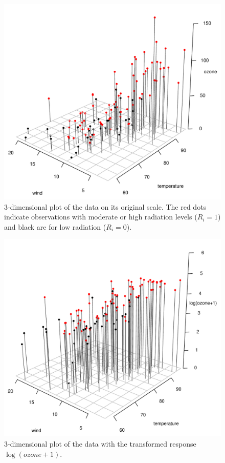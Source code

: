 \documentclass{asaproc}
\begin{document}
\begin{figure}
\begin{center}
\includegraphics[scale=0.44]{figs/crop_data.pdf}
\caption{3-dimensional plot of the data on its original scale. The red dots indicate observations with moderate or high radiation levels ($R_i=1$) and black are for low radiation ($R_i=0$).}
\label{data}
\end{center}
\end{figure}

\begin{figure}
\begin{center}
\includegraphics[scale=0.44]{figs/crop_log_data.pdf}
\caption{3-dimensional plot of the data with the transformed response $\log(ozone + 1)$.}
\label{log_data}
\end{center}
\end{figure}
\end{document}
